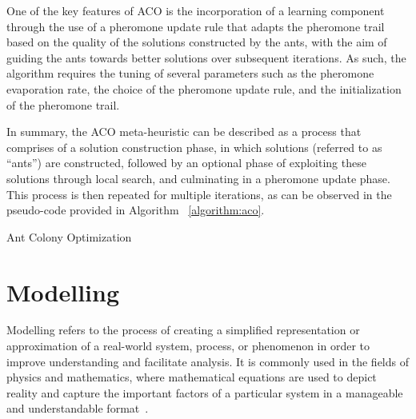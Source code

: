 One of the key features of ACO is the incorporation of a learning component
through the use of a pheromone update rule that adapts the pheromone trail based
on the quality of the solutions constructed by the ants, with the aim of guiding
the ants towards better solutions over subsequent iterations. As such, the
algorithm requires the tuning of several parameters such as the pheromone
evaporation rate, the choice of the pheromone update rule, and the
initialization of the pheromone trail.

In summary, the ACO meta-heuristic can be described as a process that comprises
of a solution construction phase, in which solutions (referred to as ``ants'')
are constructed, followed by an optional phase of exploiting these solutions
through local search, and culminating in a pheromone update phase. This process
is then repeated for multiple iterations, as can be observed in the pseudo-code
provided in Algorithm ~\ref{algorithm:aco}.

\begin{algorithm}[htb!]
    \DontPrintSemicolon
    \caption{Ant Colony Optimization}
    \label{algorithm:aco}
\end{algorithm}

\section{Modelling}
\label{section:modelling}

Modelling refers to the process of creating a simplified representation or
approximation of a real-world system, process, or phenomenon in order to improve
understanding and facilitate analysis. It is commonly used in the fields of
physics and mathematics, where mathematical equations are used to depict reality
and capture the important factors of a particular system in a manageable and
understandable format~\cite{witelski2015methods}.

